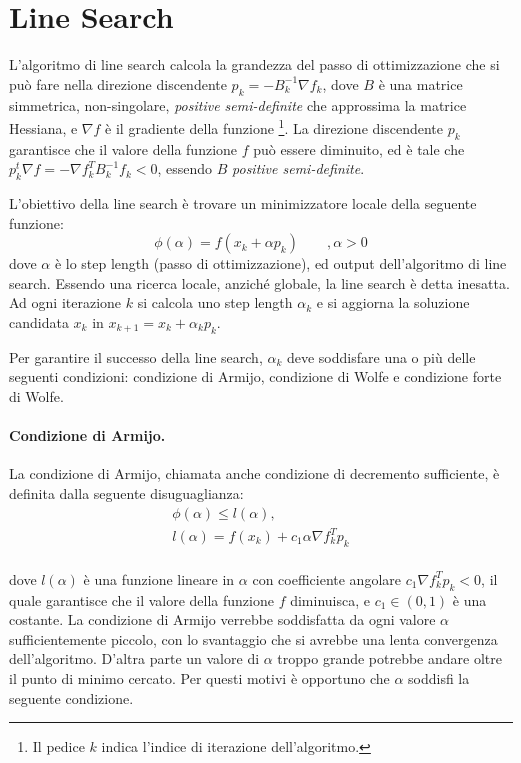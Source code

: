 \documentclass[10pt,a4paper]{article}
\author{Carlo Alessi}
\begin{document}
\section{Line Search}
L'algoritmo di line search calcola la grandezza del passo di ottimizzazione che si può fare nella direzione discendente $p_k=-B_k^{-1} \nabla f_k$, dove $B$ è una matrice simmetrica, non-singolare, \textit{positive semi-definite} che approssima la matrice Hessiana, e $\nabla f$ è il gradiente della funzione \footnote{Il pedice $k$ indica l'indice di iterazione dell'algoritmo.}. 
La direzione discendente $p_k$ garantisce che il valore della funzione $f$ può essere diminuito, ed è tale che $p_k^t \nabla f = - \nabla f_k^T B_k^{-1} f_k < 0$, essendo $B$ \textit{positive semi-definite}.

L'obiettivo della line search è trovare un minimizzatore locale della seguente funzione:
\[ \phi (\alpha) = f(x_k + \alpha p_k) \qquad, \alpha > 0 \] 
dove $\alpha$ è lo step length (passo di ottimizzazione), ed output dell'algoritmo di line search. Essendo una ricerca locale, anziché globale, la line search è detta inesatta. 
Ad ogni iterazione $k$ si calcola uno step length $\alpha_k$ e si aggiorna la soluzione candidata $x_k$ in $x_{k+1} = x_k + \alpha_k p_k$.

Per garantire il successo della line search, $\alpha_k$ deve soddisfare una o più delle seguenti condizioni: condizione di Armijo, condizione di Wolfe e condizione forte di Wolfe.

\paragraph{Condizione di Armijo.}
La condizione di Armijo, chiamata anche condizione di decremento sufficiente, è definita dalla seguente disuguaglianza:
\begin{equation}
\begin{aligned}
\phi(\alpha) \leq l(\alpha), \\
l(\alpha) = f(x_k) + c_1 \alpha \nabla f_k^Tp_k \\
\end{aligned}
\label{eq:armijo}
\end{equation}

dove $l(\alpha)$ è una funzione lineare in $\alpha$ con coefficiente angolare $c_1 \nabla f_k^Tp_k < 0$, il quale garantisce che il valore della funzione $f$ diminuisca, e $c_1 \in (0,1)$ è una costante. La condizione di Armijo verrebbe soddisfatta da ogni valore $\alpha$ sufficientemente piccolo, con lo svantaggio che si avrebbe una lenta convergenza dell'algoritmo. D'altra parte un valore di $\alpha$ troppo grande potrebbe andare oltre il punto di minimo cercato. Per questi motivi è opportuno che $\alpha$ soddisfi la seguente condizione.
\end{document}
